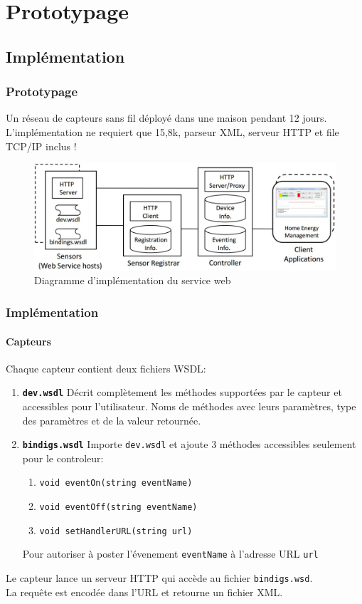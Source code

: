 \section{Prototypage}
\subsection{Implémentation}
\begin{frame}
 \frametitle{Prototypage}
 Un réseau de capteurs sans fil déployé dans une maison pendant 12 jours.
 L'implémentation ne requiert \alert{que 15,8k}, parseur XML, serveur HTTP et file TCP/IP inclus !
 \begin{figure}
  \centering
  \includegraphics[scale=0.36]{figures/implementation.jpg}
  \caption{Diagramme d'implémentation du service web}
 \end{figure} 
\end{frame}

\begin{frame}
 \frametitle{Implémentation}
 \framesubtitle{Capteurs}
 Chaque capteur contient deux fichiers WSDL:
 \begin{enumerate}
  \item \textbf{\texttt{dev.wsdl}} Décrit complètement les méthodes supportées par le capteur et accessibles pour l'utilisateur. Noms de méthodes avec leurs paramètres, type des paramètres et de la valeur retournée.
  \item \textbf{\texttt{bindigs.wsdl}} Importe \texttt{dev.wsdl} et ajoute 3 méthodes accessibles seulement pour le controleur:
   \begin{enumerate}
    \item \texttt{void eventOn(string eventName)}
    \item \texttt{void eventOff(string eventName)}
    \item \texttt{void setHandlerURL(string url)}
   \end{enumerate}
   Pour autoriser à poster l'évenement \texttt{eventName} à l'adresse URL \texttt{url}
 \end{enumerate}
 Le capteur lance un serveur HTTP qui accède au fichier \texttt{bindigs.wsd}.\\
 La requête est encodée dans l'URL et retourne un fichier XML.
\end{frame}

